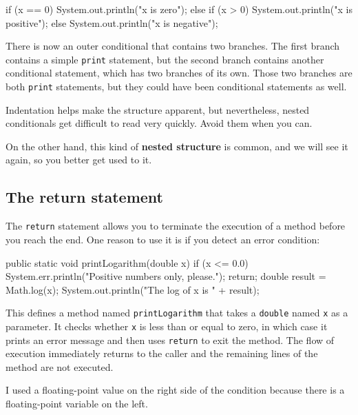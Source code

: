 \documentclass[12pt]{book}
\begin{document}
\begin{code}
    if (x == 0) {
        System.out.println("x is zero");
    } else {
        if (x > 0) {
            System.out.println("x is positive");
        } else {
            System.out.println("x is negative");
        }
    }
\end{code}

There is now an outer conditional that contains two branches.
The first branch contains a simple {\tt print} statement, but the second branch contains another conditional statement, which has two branches of its own.
Those two branches are both {\tt print} statements, but they could have been conditional statements as well.

Indentation helps make the structure apparent, but nevertheless, nested conditionals get difficult to read very quickly.
Avoid them when you can.


On the other hand, this kind of {\bf nested structure} is common, and we will see it again, so you better get used to it.

\subsection{The return statement}


The {\tt return} statement allows you to terminate the execution of a method before you reach the end.
One reason to use it is if you detect an error condition:

\begin{code}
    public static void printLogarithm(double x) {
        if (x <= 0.0) {
            System.err.println("Positive numbers only, please.");
            return;
        }
        double result = Math.log(x);
        System.out.println("The log of x is " + result);
    }
\end{code}

This defines a method named {\tt printLogarithm} that takes a {\tt  double} named {\tt x} as a parameter.
It checks whether {\tt  x} is less than or equal to zero, in which case it prints an error message and then uses {\tt return} to exit the method.
The flow of execution immediately returns to the caller and the remaining lines of the method are not executed.

I used a floating-point value on the right side of the condition because there is a floating-point variable on the left.
\end{document}
